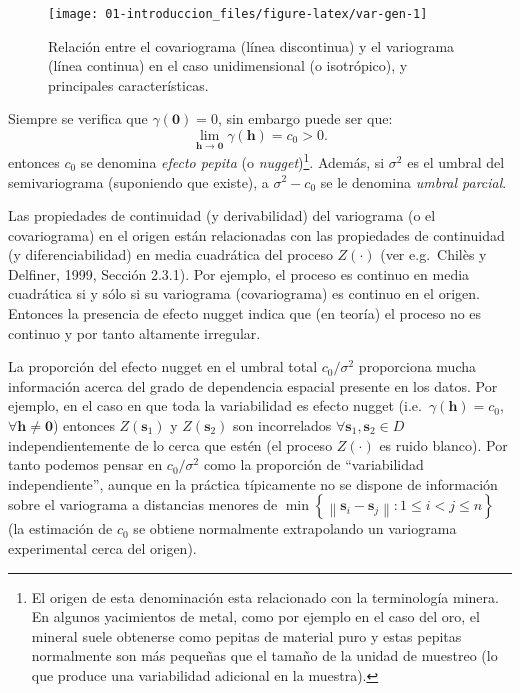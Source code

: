 \documentclass[
  spanish,
]{book}
\theoremstyle{break}
\theoremstyle{definition}
\theoremstyle{definition}
\theoremstyle{definition}
\theoremstyle{definition}
\theoremstyle{remark}
\begin{document}
\begin{figure}[!htb]

{\centering \texttt{[image: 01-introduccion\_files/figure-latex/var-gen-1]} 

}

\caption{Relación entre el covariograma (línea discontinua) y el variograma (línea continua) en el caso unidimensional (o isotrópico), y principales características.}\label{fig:var-gen}
\end{figure}

Siempre se verifica que \(\gamma (\mathbf{0})=0\), sin embargo puede ser que:
\[\lim \limits_{\mathbf{h}\rightarrow \mathbf{0}} \gamma(\mathbf{h}) = c_0 > 0.\]
entonces \(c_0\) se denomina \emph{efecto pepita} (o \emph{nugget})\footnote{El origen de esta denominación esta relacionado con la terminología minera. En algunos yacimientos de metal, como por ejemplo en el caso del oro, el mineral suele obtenerse como pepitas de material puro y estas pepitas normalmente son más pequeñas que el tamaño de la unidad de muestreo (lo que produce una variabilidad adicional en la muestra).}.
Además, si \(\sigma^{2}\) es el umbral del semivariograma (suponiendo que existe), a \(\sigma ^{2} -c_0\) se le denomina \emph{umbral parcial}.

Las propiedades de continuidad (y derivabilidad) del variograma (o el covariograma) en el origen están relacionadas con las propiedades de continuidad (y diferenciabilidad) en media cuadrática del proceso \(Z(\cdot)\) (ver e.g.~Chilès y Delfiner, 1999, Sección 2.3.1).
Por ejemplo, el proceso es continuo en media cuadrática si y sólo si su variograma (covariograma) es continuo en el origen. Entonces la presencia de efecto nugget indica que (en teoría) el proceso no es continuo y por tanto altamente irregular.

La proporción del efecto nugget en el umbral total \(c_0 /\sigma^{2}\) proporciona mucha información acerca del grado de dependencia espacial presente en los datos.
Por ejemplo, en el caso en que toda la variabilidad es efecto nugget (i.e.~\(\gamma (\mathbf{h})=c_0\), \(\forall \mathbf{h}\neq \mathbf{0}\)) entonces \(Z(\mathbf{s}_1)\) y \(Z(\mathbf{s}_2)\) son incorrelados \(\forall \mathbf{s}_1 ,\mathbf{s}_2 \in D\) independientemente de lo cerca que estén (el proceso \(Z(\cdot)\) es ruido blanco).
Por tanto podemos pensar en \(c_0 /\sigma^{2}\) como la proporción de ``variabilidad independiente'', aunque en la práctica típicamente no se dispone de información sobre el variograma a distancias menores de \(\min \left\{ \left\| \mathbf{s}_{i} -\mathbf{s}_{j} \right\| :1\leq i<j\leq n\right\}\) (la estimación de \(c_0\) se obtiene normalmente extrapolando un variograma experimental cerca del origen).
\end{document}
